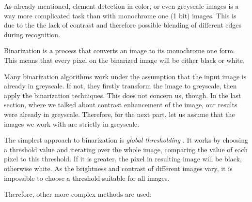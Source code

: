 As already mentioned, element detection in color, or even greyscale images is a way more complicated task than with monochrome one (1 bit) images. This is due to the the lack of contrast and therefore possible blending of different edges during recognition.

Binarization is a process that converts an image to its monochrome one form. This means that every pixel on the binarized image will be either black or white.

Many binarization algorithms work under the assumption that the input image is already in greyscale. If not, they firstly transform the image to greyscale, then apply the binarization techniques. This does not concern us, though. In the last section, where we talked about contrast enhancement of the image, our results were already in greyscale. Therefore, for the next part, let us assume that the images we work with are strictly in greyscale.

The simplest approach to binarization is \emph{global thresholding} \citep{globalThresh}. It works by choosing a threshold value and iterating over the whole image, comparing the value of each pixel to this threshold. If it is greater, the pixel in resulting image will be black, otherwise white. As the brightness and contrast of different images vary, it is impossible to choose a threshold suitable for all images.

Therefore, other more complex methods are used:

